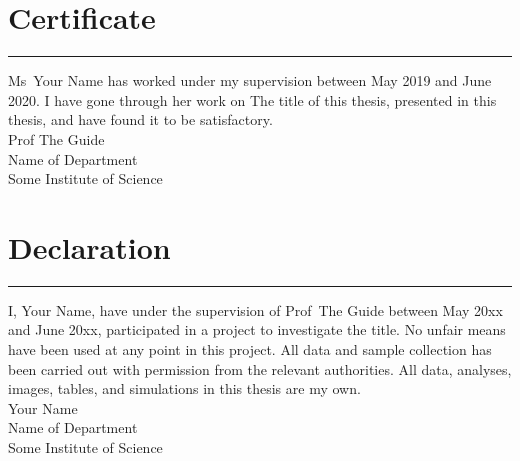 \documentclass[a4paper, oneside, 11pt]{book}
\begin{document}
\chapter*{Certificate}
\hrule
\vspace{1em}
Ms\ Your Name has worked under my supervision between May 2019 and June 2020. I have gone through her work on The title of this thesis, presented in this thesis, and have found it to be satisfactory.\\

Prof The Guide\\
Name of Department\\
Some Institute of Science\\

\chapter*{Declaration}
\hrule
\vspace{1em}
I, Your Name, have under the supervision of Prof\ The Guide between May 20xx and June 20xx, participated in a project to investigate the title. No unfair means have been used at any point in this project. All data and sample collection has been carried out with permission from the relevant authorities. All data, analyses, images, tables, and simulations in this thesis are my own.\\

Your Name\\
Name of Department\\
Some Institute of Science\\[2em]
\newpage

\end{document}

